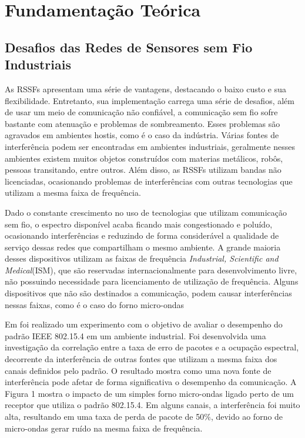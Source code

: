 \chapter[Fundamentação Teórica]{Fundamentação Teórica}
\label{cap:Fundamentação Teórica}

\section{Desafios das Redes de Sensores sem Fio Industriais}
\label{sec:desafios}

As RSSFs apresentam uma série de vantagens, destacando o baixo custo e sua flexibilidade. Entretanto, sua implementação carrega uma série de desafios, além de usar um meio de comunicação não confiável, a comunicação sem fio sofre bastante com atenuação e problemas de sombreamento. 
Esses problemas são agravados em ambientes hostis, como é o caso da indústria. Várias fontes de interferência podem ser encontradas em ambientes industriais, geralmente nesses ambientes existem muitos objetos construídos com materias metálicos, robôs, pessoas transitando, entre outros. 
Além disso, as RSSFs utilizam bandas não licenciadas, ocasionando problemas de interferências com outras tecnologias que utilizam a mesma  faixa de frequência\cite{gomes2017estimaccao}.

Dado o constante crescimento no uso de tecnologias que utilizam comunicação sem fio, o espectro disponível acaba ficando mais congestionado e poluído, ocasionando interferências e reduzindo de forma considerável a qualidade de serviço dessas redes que compartilham o mesmo ambiente. A grande maioria desses dispositivos utilizam as faixas de frequência \textit{Industrial, Scientific and Medical}(ISM), que são reservadas internacionalmente para desenvolvimento livre, não possuindo necessidade para licenciamento de utilização de frequência. Alguns dispositivos que não são destinados a comunicação, podem causar interferências nessas faixas, como é o caso do forno micro-ondas\cite{sousa2011desafios}

Em \cite{gomes2012correlation} foi realizado um experimento com o objetivo de avaliar o desempenho do padrão IEEE 802.15.4 em um ambiente industrial. Foi desenvolvida uma investigação da correlação entre a taxa de erro de pacotes e a ocupação espectral, decorrente da interferência de outras fontes que utilizam a mesma faixa dos canais definidos pelo padrão. O resultado mostra como uma nova fonte de interferência pode afetar de forma significativa o desempenho da comunicação. A Figura 1 mostra o impacto de um simples forno micro-ondas ligado perto de um receptor que utiliza o padrão 802.15.4. Em alguns canais, a interferência foi muito alta, resultando em uma taxa de perda de pacote de 50\%, devido ao forno de micro-ondas gerar ruído na mesma faixa de frequência.

